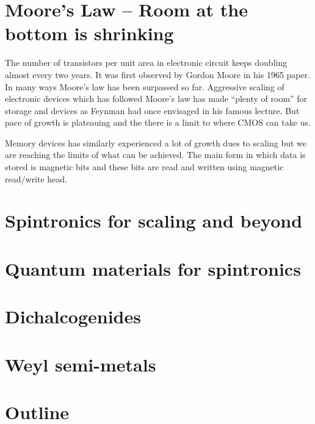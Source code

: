\label{introduction}

\section{Moore’s Law – Room at the bottom is shrinking}
The number of transistors per unit area in electronic circuit keeps doubling almost every two years. 
It was first observed by Gordon Moore in his 1965 paper. In many ways Moore’s law has been surpassed 
so far. Aggressive scaling of electronic devices which has followed Moore’s law has made “plenty of room” 
for storage and devices as Feynman had once envisaged in his famous lecture. But pace of growth is plateauing 
and the there is a limit to where CMOS can take us. 

Memory devices has similarly experienced a lot of growth dues to scaling but we are reaching the limits of what
can be achieved. The main form in which data is stored is magnetic bits and these bits are read and written using
magnetic read/write head. 

\section{Spintronics for scaling and beyond}


\section{Quantum materials for spintronics}

\section{Dichalcogenides}

\section{Weyl semi-metals}

\section{Outline}
